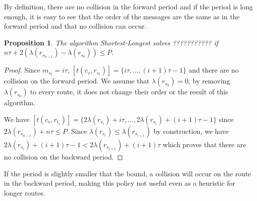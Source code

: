 \documentclass[a4paper,10pt]{article}
\newtheorem{proposition}{Proposition}
\begin{document}
     By definition, there are no collision in the forward period and if the period is long enough, 
     it is easy to see that the order of the messages are the same as in the forward period and that no collision can occur. 
      
      
      \begin{proposition}
       The algorithm Shortest-Longest solves ??????????? if $n\tau + 2(\lambda(r_{s_{n-1}}) - \lambda(r_{s_0})) \leq P$.
      \end{proposition}
      \begin{proof}
       Since $m_{s_i} = i\tau$, $[t(c_s,r_{s_i})] = \{i\tau,\dots, (i+1)\tau -1\}$ and there are no collision on the forward period.
       We assume that $\lambda(r_{s_0}) = 0$, by removing $\lambda(r_{s_0})$ to every route, it does not change their order
       or the result of this algorithm.
      
      
      We have  $[t(c_s,r_{t_i})] = \{2 \lambda(r_{s_i}) + i\tau, \dots,  2 \lambda(r_{s_i}) + (i+1)\tau -1\}$ since $2 \lambda(r_{s_{n-1 }}) + n\tau \leq P$.
       Since $ \lambda(r_{s_i}) \leq  \lambda(r_{s_{i+1}})$ by construction, we have  $2 \lambda(r_{s_i}) + (i+1)\tau -1 < 2 \lambda(r_{s_{i+1}}) + (i+1)\tau$
       which proves that there are no collision on the backward period. 
      \end{proof}

      
      If the period is slightly smaller that the bound, a collision will occur on the route in the backward period, making 
      this policy not useful even as a heuristic for longer routes. 
      
%       
% 
% 
%       
% 
%    
   
\end{document}
